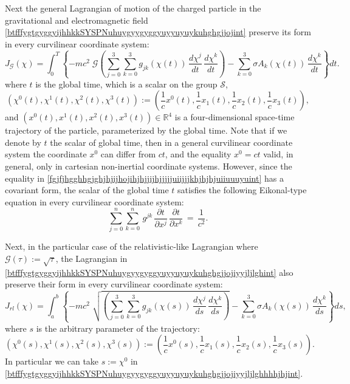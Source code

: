 \documentclass{article}
\theoremstyle{definition}
\theoremstyle{remark}
\newcommand{\er}{\eqref}
\newcommand{\er}{\eqref}
\begin{document}
Next the general Lagrangian of motion of the charged particle in the
gravitational and electromagnetic field
\er{btfffygtgyggyijhhkkSYSPNuhuygyygyggyuyyuyuykuhghgjjojint}
preserve its form in every curvilinear coordinate system:
\begin{equation}\label{btfffygtgyggyijhhkkSYSPNuhuygyygyggyuyyuyuykuhghgjjojhjfgint}
J_{\mathcal{G}}(\chi)=
\int_0^T\left\{-mc^2\;\mathcal{G}\left(\sum_{j=0}^{3}\sum_{k=0}^{3}g_{jk}\left(\chi(t)\right)\,\frac{d\chi^j}{dt}\,\frac{d\chi^k}{dt}\right)-\sum_{k=0}^{3}\sigma
A_k\left(\chi(t)\right)\,\frac{d\chi^k}{dt}\right\}dt.
\end{equation}
where $t$ is the global time, which is a scalar on the group
$\mathcal{S}$,
\begin{equation}\label{btfffjhgjghghijhhint}
\left(\chi^0(t),\chi^1(t),\chi^2(t),\chi^3(t)\right):=\left(\frac{1}{c}x^0(t),\frac{1}{c}x_1(t),\frac{1}{c}x_2(t),\frac{1}{c}x_3(t)\right),
\end{equation}
and $\left(x^0(t),x^1(t),x^2(t),x^3(t)\right)\in\mathbb{R}^4$ is a
four-dimensional space-time trajectory of the particle,
parameterized by the global time. Note that if we denote by $t$ the
scalar of global time, then in a general curvilinear coordinate
system the coordinate $x^0$ can differ from $ct$, and the equality
$x^0=ct$ valid, in general, only in cartesian non-inertial
coordinate systems. However, since the equality in
\er{fgjfjhgghhgjghjhjijhojihjhjjijhjjjjjuiijjjkhjhjhjuiiuuuyuint}
has a covariant form, the scalar of the global time $t$ satisfies
the following Eikonal-type equation in every curvilinear coordinate
system:
\begin{equation}\label{fgjfjhgghhgjghjhjijhojihjhjjijhjjjjjuiijjjkhjhjhjuiiuuuyuuoiuuiioint}
\sum_{j=0}^{n}\sum_{k=0}^{n}\,g^{jk}
\,\frac{\partial
t}{\partial x^j}
\,\frac{\partial t}{\partial
x^k}
\,=\, \frac{1}{c^2}.
\end{equation}



Next, in the particular case of the relativistic-like Lagrangian
where $\mathcal{G}(\tau):=\sqrt{\tau}$, the Lagrangian in
\er{btfffygtgyggyijhhkkSYSPNuhuygyygyggyuyyuyuykuhghgjjojiyyjljlghint}
also preserve their form in every curvilinear coordinate system:
\begin{equation}\label{btfffygtgyggyijhhkkSYSPNuhuygyygyggyuyyuyuykuhghgjjojiyyjljlghhhhjhjint}
J_{rl}(\chi)=
\int_a^b\left\{-mc^2\;\sqrt{\left(\sum_{j=0}^{3}\sum_{k=0}^{3}g_{jk}\left(\chi(s)\right)\,\frac{d\chi^j}{ds}\,\frac{d\chi^k}{ds}\right)}-\sum_{k=0}^{3}\sigma
A_k\left(\chi(s)\right)\,\frac{d\chi^k}{ds}\right\}ds,
\end{equation}
where $s$ is the arbitrary parameter of the trajectory:
\begin{equation}\label{btfffjhgjghghijhhhuint}
\left(\chi^0(s),\chi^1(s),\chi^2(s),\chi^3(s)\right):=\left(\frac{1}{c}x^0(s),\frac{1}{c}x_1(s),\frac{1}{c}x_2(s),\frac{1}{c}x_3(s)\right).
\end{equation}
In particular we can take $s:=\chi^0$ in
\er{btfffygtgyggyijhhkkSYSPNuhuygyygyggyuyyuyuykuhghgjjojiyyjljlghhhhjhjint}.
\end{document}
